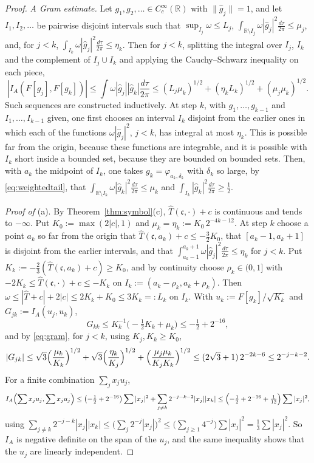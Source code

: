 \documentclass[11pt]{amsart}
\theoremstyle{definition}
\theoremstyle{remark}
\newcommand{\R}{\mathbb R}
\newcommand{\Th}{\widehat{T}}
\begin{document}
\begin{proof}
\emph{A Gram estimate.}  Let $g_1,g_2,\dots\in C_c^{\infty}(\R)$ with
$\lVert\widehat g_j\rVert=1$, and let $I_1,I_2,\dots$ be pairwise disjoint
intervals such that $\sup_{I_j}\omega\le L_j$,
$\int_{\R\setminus I_j}\omega|\widehat g_j|^{2}\frac{d\tau}{2\pi}\le
\mu_j$, and, for $j<k$,
$\int_{I_k}\omega|\widehat g_j|^{2}\frac{d\tau}{2\pi}\le\eta_k$.  Then for
$j<k$, splitting the integral over $I_j$, $I_k$ and the complement of
$I_j\cup I_k$ and applying the Cauchy--Schwarz inequality on each piece,
\begin{equation}\label{eq:gram}
|I_A(F[g_j],F[g_k])|\le\int\omega|\widehat g_j||\widehat g_k|
\frac{d\tau}{2\pi}\le(L_j\mu_k)^{1/2}+(\eta_kL_k)^{1/2}
+(\mu_j\mu_k)^{1/2}.
\end{equation}
Such sequences are constructed inductively.  At step $k$, with
$g_1,\dots,g_{k-1}$ and $I_1,\dots,I_{k-1}$ given, one first chooses an
interval $I_k$ disjoint from the earlier ones in which each of the functions
$\omega|\widehat g_j|^{2}$, $j<k$, has integral at most $\eta_k$.  This is
possible far from the origin, because these functions are integrable, and it
is possible with $I_k$ short inside a bounded set, because they are bounded on
bounded sets.  Then, with $a_k$ the midpoint of $I_k$, one takes
$g_k=\varphi_{a_k,\delta_k}$ with $\delta_k$ so large, by
\eqref{eq:weightedtail}, that
$\int_{\R\setminus I_k}\omega|\widehat g_k|^{2}\frac{d\tau}{2\pi}\le
\mu_k$ and
$\int_{I_k}|\widehat g_k|^{2}\frac{d\tau}{2\pi}\ge\tfrac12$.

\emph{Proof of} (a).  By Theorem~\ref{thm:symbol}(c), $\Th(\mathfrak c,\cdot)+c$
is continuous and tends to $-\infty$.  Put $K_0:=\max(2|c|,1)$ and
$\mu_k=\eta_k:=K_0\,2^{-4k-12}$.  At step $k$ choose a point $a_k$ so
far from the origin that $\Th(\mathfrak c,a_k)+c\le-\tfrac32K_0$, that
$[a_k-1,a_k+1]$ is disjoint from the earlier intervals, and that
$\int_{a_k-1}^{a_k+1}\omega|\widehat g_j|^{2}\frac{d\tau}{2\pi}\le\eta_k$ for
$j<k$.  Put $K_k:=-\tfrac23(\Th(\mathfrak c,a_k)+c)\ge K_0$, and by continuity
choose $\rho_k\in(0,1]$ with
$-2K_k\le\Th(\mathfrak c,\cdot)+c\le-K_k$ on
$I_k:=(a_k-\rho_k,a_k+\rho_k)$.  Then
$\omega\le|\Th+c|+2|c|\le2K_k+K_0\le3K_k=:L_k$ on $I_k$.  With
$u_k:=F[g_k]/\sqrt{K_k}$ and $G_{jk}:=I_A(u_j,u_k)$,
\[
G_{kk}\le K_k^{-1}\bigl(-\tfrac12K_k+\mu_k\bigr)\le-\tfrac12+2^{-16},
\]
and by \eqref{eq:gram}, for $j<k$, using $K_j,K_k\ge K_0$,
\[
|G_{jk}|\le\sqrt3\Bigl(\frac{\mu_k}{K_k}\Bigr)^{1/2}
+\sqrt3\Bigl(\frac{\eta_k}{K_j}\Bigr)^{1/2}
+\Bigl(\frac{\mu_j\mu_k}{K_jK_k}\Bigr)^{1/2}
\le(2\sqrt3+1)\,2^{-2k-6}\le2^{-j-k-2}.
\]
For a finite combination $\sum_jx_ju_j$,
\[
I_A\Bigl(\sum x_ju_j,\sum x_ju_j\Bigr)\le\bigl(-\tfrac12+2^{-16}\bigr)\sum|x_j|^{2}
+\sum_{j\ne k}2^{-j-k-2}|x_j||x_k|
\le\Bigl(-\tfrac12+2^{-16}+\tfrac1{12}\Bigr)\sum|x_j|^{2},
\]
using $\sum_{j\ne k}2^{-j-k}|x_j||x_k|\le\bigl(\sum_j2^{-j}|x_j|\bigr)^{2}\le
\bigl(\sum_{j\ge1}4^{-j}\bigr)\sum|x_j|^{2}=\tfrac13\sum|x_j|^{2}$.  So $I_A$ is
negative definite on the span of the $u_j$, and the same inequality shows that
the $u_j$ are linearly independent.


\end{proof}
\end{document}
